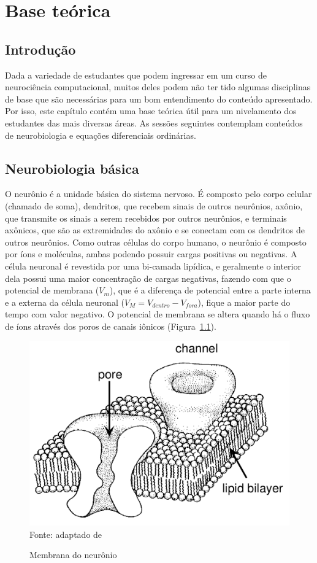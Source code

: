 \chapter{Base teórica}\label{cap:teoria}
\section{Introdução}\label{sec:teoria_intro}
Dada a variedade de estudantes que podem ingressar em um curso de neurociência computacional, muitos deles podem não ter tido algumas disciplinas de base que são necessárias para um bom entendimento do conteúdo apresentado. Por isso, este capítulo contém uma base teórica útil para um nivelamento dos estudantes das mais diversas áreas. As sessões seguintes contemplam conteúdos de neurobiologia e equações diferenciais ordinárias. %

\section{Neurobiologia básica}\label{sec:fisiologia}
O neurônio é a unidade básica do sistema nervoso.
É composto pelo corpo celular (chamado de soma), dendritos, que recebem sinais de outros neurônios, axônio, que transmite os sinais a serem recebidos por outros neurônios, e terminais axônicos, que são as extremidades do axônio e se conectam com os dendritos de outros neurônios. Como outras células do corpo humano, o neurônio é composto por íons e moléculas, ambas podendo possuir cargas positivas ou negativas. A célula neuronal é revestida por uma bi-camada lipídica, e geralmente o interior dela possui uma maior concentração de cargas negativas, fazendo com que o potencial de membrana ($V_m$), que é a diferença de potencial entre a parte interna e a externa da célula neuronal ($V_M=V_{dentro}-V_{fora}$), fique a maior parte do tempo com valor negativo. O potencial de membrana se altera quando há o fluxo de íons através dos poros de canais iônicos (Figura~\ref{fig:membrananeuronio}).

\begin{figure}[tb]
	\centering
	\caption[Membrana do neurônio]{Membrana do neurônio}
	\includegraphics[width=0.55\linewidth]{figs/membrana_neuronio}
	\label{fig:membrananeuronio}
	\\
	Fonte: adaptado de \cite{hille_ionic_1992}
\end{figure}

